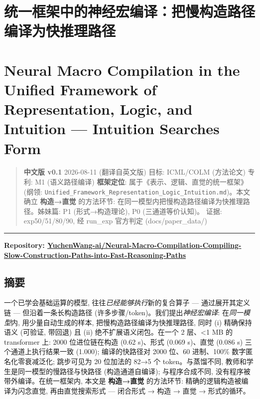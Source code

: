 \documentclass[
]{article}
\author{}
\date{}
\begin{document}
\section{统一框架中的神经宏编译：把慢构造路径编译为快推理路径}\label{ux7edfux4e00ux6846ux67b6ux4e2dux7684ux795eux7ecfux5b8fux7f16ux8bd1ux628aux6162ux6784ux9020ux8defux5f84ux7f16ux8bd1ux4e3aux5febux63a8ux7406ux8defux5f84}

\section{Neural Macro Compilation in the Unified Framework of
Representation, Logic, and Intuition --- Intuition Searches
Form}\label{neural-macro-compilation-in-the-unified-framework-of-representation-logic-and-intuition-intuition-searches-form}

\begin{quote}
\textbf{中文版 v0.1} \textbar{} 2026-08-11 (翻译自英文版) 目标:
ICML/COLM (方法论文) \textbar{} 专利: M1 (语义路径编译)
\textbf{框架定位}: 属于《表示、逻辑、直觉的统一框架》(纲领:
\texttt{Unified\_Framework\_Representation\_Logic\_Intuition.md})。本文确立
\textbf{构造→直觉} 的方法环节:
在同一模型内把慢构造路径编译为快推理路径。姊妹篇: P1 (形式→构造理论), P0
(三通道等价认知)。 证据: exp50/51/80/90, 经 run\_exp 官方判定
(docs/paper\_data/)
\end{quote}

\begin{center}\rule{0.5\linewidth}{0.5pt}\end{center}

\textbf{Repository:
\href{https://github.com/YuchenWang-ai/Neural-Macro-Compilation-Compiling-Slow-Construction-Paths-into-Fast-Reasoning-Paths}{YuchenWang-ai/Neural-Macro-Compilation-Compiling-Slow-Construction-Paths-into-Fast-Reasoning-Paths}}

\subsection{摘要}\label{ux6458ux8981}

一个已学会基础运算的模型, 往往\emph{已经能够执行}新的复合算子 ---
通过展开其定义链 --- 但沿着一条长构造路径
(许多步骤/token)。我们提出\emph{神经宏编译}: 在\emph{同一模型}内,
用少量自动生成的样本, 把慢构造路径编译为快推理路径, 同时 (i)
精确保持语义 (可验证, 带回退) 且 (ii) 绝不扩展语义闭包。在一个 2
层、\textless1 MB 的 transformer 上: 2000 位进位链在构造 (0.62 s)、形式
(0.069 s)、直觉 (0.086 s) 三个通道上执行结果一致 (1.000); 编译的快路径对
2000 位、60 进制、100\% 数字匿名化零衰减泛化; 跳步可见为 20 位加法的
82→5 个 token。与蒸馏不同, 教师和学生是同一模型的慢路径与快路径
(构造通道自编译); 与程序合成不同, 没有程序被带外编译。在统一框架内,
本文是 \textbf{构造→直觉} 的方法环节: 精确的逻辑构造被编译为闪念直觉,
再由直觉搜索形式 --- 闭合形式 → 构造 → 直觉 → 形式的循环。
\end{document}
